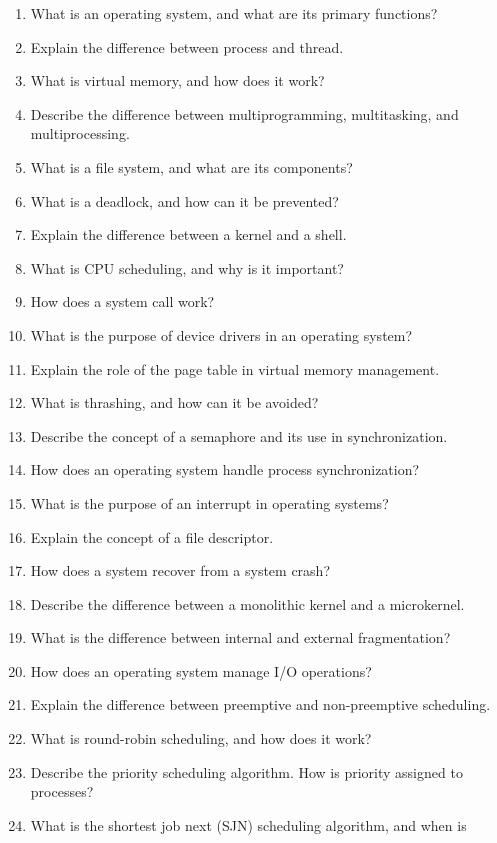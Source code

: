 \begin{enumerate}
\def\labelenumi{\arabic{enumi}.}
\tightlist
\item
  What is an operating system, and what are its primary functions?
\item
  Explain the difference between process and thread.
\item
  What is virtual memory, and how does it work?
\item
  Describe the difference between multiprogramming, multitasking, and
  multiprocessing.
\item
  What is a file system, and what are its components?
\item
  What is a deadlock, and how can it be prevented?
\item
  Explain the difference between a kernel and a shell.
\item
  What is CPU scheduling, and why is it important?
\item
  How does a system call work?
\item
  What is the purpose of device drivers in an operating system?
\item
  Explain the role of the page table in virtual memory management.
\item
  What is thrashing, and how can it be avoided?
\item
  Describe the concept of a semaphore and its use in synchronization.
\item
  How does an operating system handle process synchronization?
\item
  What is the purpose of an interrupt in operating systems?
\item
  Explain the concept of a file descriptor.
\item
  How does a system recover from a system crash?
\item
  Describe the difference between a monolithic kernel and a microkernel.
\item
  What is the difference between internal and external fragmentation?
\item
  How does an operating system manage I/O operations?
\item
  Explain the difference between preemptive and non-preemptive
  scheduling.
\item
  What is round-robin scheduling, and how does it work?
\item
  Describe the priority scheduling algorithm. How is priority assigned
  to processes?
\item
  What is the shortest job next (SJN) scheduling algorithm, and when is

\end{enumerate}
